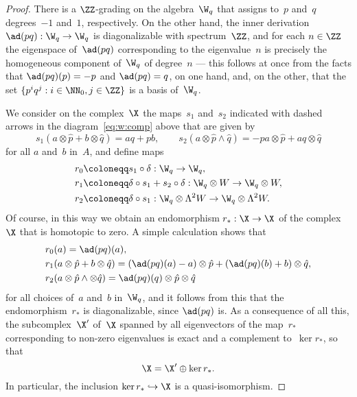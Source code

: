 \begin{proof}
There is a $\ZZ$-grading on the algebra~$\W_q$ that assigns to~$p$ and~$q$
degrees~$-1$ and~$1$, respectively. On the other hand, the inner derivation
$\ad(pq):\W_q\to\W_q$ is diagonalizable with spectrum~$\ZZ$, and for each
$n\in\ZZ$ the eigenspace of~$\ad(pq)$ corresponding to the eigenvalue~$n$
is precisely the homogeneous component of~$\W_q$ of degree~$n$ --- this
follows at once from the facts that $\ad(pq)(p)=-p$ and $\ad(pq)=q$, on one
hand, and, on the other, that the set $\{p^iq^j:i\in\NN_0,j\in\ZZ\}$ is a
basis of~$\W_q$.

We consider on the complex~$\X$ the maps~$s_1$ and~$s_2$ indicated with
dashed arrows in the diagram~\eqref{eq:w:comp} above that are given by
  \[
  s_1(a\otimes\hat p+b\otimes\hat q) = aq+pb, 
  \qquad
  s_2(a\otimes\hat p\wedge\hat q) = -pa\otimes\hat p+aq\otimes\hat q
  \]
for all $a$ and~$b$ in~$A$, and define maps
  \begin{align}
  & r_0 \coloneqq s_1\circ\delta 
        : \W_q\to\W_q, \\
  & r_1 \coloneqq \delta\circ s_1 + s_2\circ\delta
        : \W_q\otimes W\to\W_q\otimes W, \\
  & r_2 \coloneqq \delta\circ s_1
        : \W_q\otimes\Lambda^2W \to \W_q\otimes\Lambda^2W.
  \end{align}
Of course, in this way we obtain an endomorphism $r_*:\X\to\X$ of the
complex~$\X$ that is homotopic to zero. A simple calculation shows that
  \begin{align}
  & r_0(a) 
        = \ad(pq)(a),  \\
  & r_1(a\otimes\hat p+b\otimes\hat q)
        = (\ad(pq)(a)-a)\otimes\hat p + (\ad(pq)(b)+b)\otimes\hat q, \\
  & r_2(a\otimes\hat p\wedge\otimes\hat q)
        = \ad(pq)(q)\otimes\hat p\otimes\hat q
  \end{align}
for all choices of~$a$ and~$b$ in~$\W_q$, and it follows from this that the
endomorphism~$r_*$ is diagonalizable, since $\ad(pq)$ is. As a consequence
of all this, the subcomplex~$\X'$ of~$\X$ spanned by all eigenvectors of
the map~$r_*$ corresponding to non-zero eigenvalues is exact and a
complement to~$\ker r_*$, so that 
  \[ \label{eq:xx:desc}
  \X=\X'\oplus\ker r_*.
  \]
In particular, the inclusion $\ker r_*\hookrightarrow\X$ is a quasi-isomorphism.


\end{proof}
